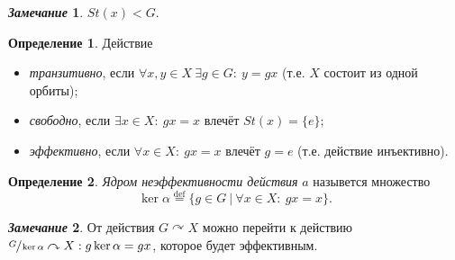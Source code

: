 \documentclass[a4paper, 14pt]{extarticle}
\newcommand{\deq}{\stackrel{\mathrm{def}}{=}}
\theoremstyle{definition}
\newtheorem*{remark}{\textit{Замечание}}
\newtheorem{definition}{Определение}
\theoremstyle{plain}
\numberwithin{theorem}{section}
\numberwithin{definition}{section}
\numberwithin{statement}{section}
\numberwithin{lemma}{section}
\numberwithin{consequence}{section}
\begin{document}
        \begin{remark}
            $St(x) < G.$
        \end{remark}
        \begin{definition}
            Действие
            \begin{itemize}
                \setlength\itemsep{0.1em}
                \item \textit{транзитивно}, если $\forall x,y \in X \ \exists g \in G{:} \ y = gx$ (т.е. $X$ состоит из одной орбиты);
                \item \textit{свободно}, если $\exists x \in X{:} \ gx = x$ влечёт $St(x) = \{e\};$
                \item \textit{эффективно}, если ${\forall x \in X{:} \ gx = x}$ влечёт ${g = e}$ (т.е. действие инъективно).
            \end{itemize}
        \end{definition}
        \begin{definition}
            \textit{Ядром неэффективности действия} $a$ назывется множество 
            \begin{equation*}
                \ker \alpha \deq \{g \in G \ | \ \forall x \in X{:} \ gx = x\}.
            \end{equation*}
        \end{definition}
        \begin{remark}
            От действия ${G \curvearrowright X}$ можно перейти к действию ${\sfrac{G}{\ker \alpha} \curvearrowright X : g \ker \alpha = gx}$, которое будет эффективным.
        \end{remark}
\end{document}
